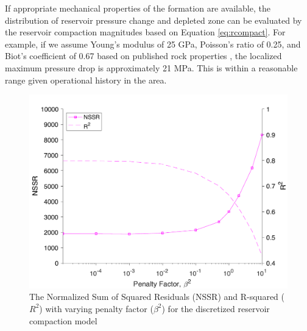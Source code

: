 If appropriate mechanical properties of the formation are available, the distribution of reservoir pressure change and depleted zone can be evaluated by the reservoir compaction magnitudes based on Equation \eqref{eq:rcompact}. For example, if we assume Young’s modulus of 25 GPa, Poisson’s ratio of 0.25, and Biot’s coefficient of 0.67 based on published rock properties \citep{Shukla2013NanoindentationStudiesShales, Xu2015AnalysisStressVariations}, the localized maximum pressure drop is approximately 21 MPa. This is within a reasonable range given operational history in the area.



\begin{figure}
	\centering
	\includegraphics[width=\textwidth]{figures/chapter4-grl/supplement/figureS12-reservoir-nssr.pdf}
	\caption[ Normalized Sum of Squared Residuals (NSSR) and R-squared for reservoir compaction model]{The Normalized Sum of Squared Residuals (NSSR) and R-squared ($ R^2 $) with varying penalty factor ($ \beta^2 $) for the discretized reservoir compaction model
	}
	\label{fig:model-reservoir-nssr}
\end{figure}

